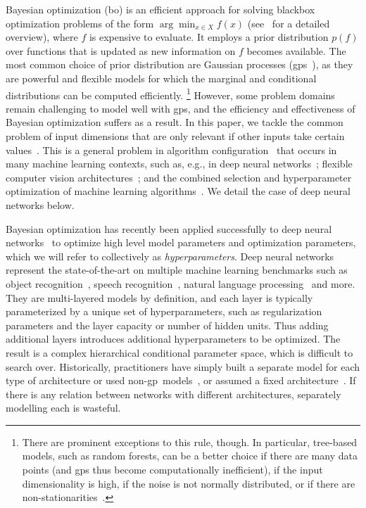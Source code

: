 \documentclass{article}
\newcommand{\bo}{{\sc bo}}
\newcommand{\gp}{{\sc gp}}
\begin{document}

Bayesian optimization (\bo) is an efficient approach for solving blackbox optimization problems of the form $\arg\min_{x \in X} f(x)$ (see~\cite{Brochu2010} for a detailed overview), where $f$ is expensive to evaluate. 
It employs a prior distribution $p(f)$ over functions that is updated as new information on $f$ becomes available.
%
The most common choice of prior distribution are Gaussian processes (\gp s~\cite{rasmussen38gaussian}), as they are powerful and flexible models for which the marginal and conditional distributions can be computed efficiently.
\footnote{There are prominent exceptions to this rule, though.
In particular, tree-based models, such as random forests, can be a better choice if there are many data points (and \gp s thus become computationally inefficient), if the input dimensionality is high, if the noise is not normally distributed, or if there are non-stationarities~\cite{TadGraPol11,HutHooLey11,bergstra2011algorithms}.}
%
However, some problem domains remain challenging to model well with \gp s, and the efficiency and effectiveness of Bayesian optimization suffers as a result. In this paper, we tackle the common problem of input dimensions that are only relevant if other inputs take certain values~\cite{Hut09:phd,bergstra2011algorithms}.
This is a general problem in algorithm configuration~\cite{Hut09:phd} that occurs in many machine learning contexts, such as, e.g., in deep neural networks~\cite{HinOsiTeh06}; flexible computer vision architectures~\cite{BerYamCox13}; and the combined selection and hyperparameter optimization of machine learning algorithms~\cite{ThoEtAl13}.
We detail the case of deep neural networks below.

Bayesian optimization has recently been applied successfully to deep neural networks~\cite{snoek-etal-2012b, bergstra2011algorithms} to optimize high level model parameters and optimization parameters, which we will refer to collectively as \emph{hyperparameters}.
Deep neural networks represent the state-of-the-art on multiple machine learning benchmarks such as object recognition~\cite{krizhevsky-2012}, speech recognition~\cite{deepSpeechReviewSPM2012}, natural language processing~\cite{mikolov2010recurrent} and more.
They are multi-layered models by definition, and each layer is typically parameterized by a unique set of hyperparameters, such as regularization parameters and the layer capacity or number of hidden units.
Thus adding additional layers introduces additional hyperparameters to be optimized.
The result is a complex hierarchical conditional parameter space, which is difficult to search over.
Historically, practitioners have simply built a separate model for each type of architecture or used non-\gp~models~\cite{bergstra2011algorithms}, or assumed a fixed architecture~\cite{snoek-etal-2012b}.
If there is any relation between networks with different architectures, separately modelling each is wasteful. 
\end{document}
